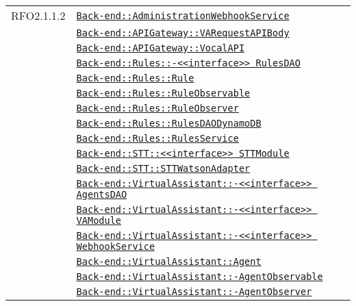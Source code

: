 \begin{longtable}{|>{\centering}m{3cm}|m{10cm}<{\centering}|}
RFO2.1.1.2 & \hyperref[Back-end::AdministrationWebhookService]{\texttt{Back-end::AdministrationWebhookService}}\\
& \hyperref[Back-end::APIGateway::VARequestAPIBody]{\texttt{Back-end::APIGateway::VARequestAPIBody}}\\
& \hyperref[Back-end::APIGateway::VocalAPI]{\texttt{Back-end::APIGateway::VocalAPI}}\\
& \hyperref[Back-end::Rules::<<interface>> RulesDAO]{\texttt{Back-end::Rules::-\linebreak <<interface>> RulesDAO}}\\
& \hyperref[Back-end::Rules::Rule]{\texttt{Back-end::Rules::Rule}}\\
& \hyperref[Back-end::Rules::RuleObservable]{\texttt{Back-end::Rules::RuleObservable}}\\
& \hyperref[Back-end::Rules::RuleObserver]{\texttt{Back-end::Rules::RuleObserver}}\\
& \hyperref[Back-end::Rules::RulesDAODynamoDB]{\texttt{Back-end::Rules::RulesDAODynamoDB}}\\
& \hyperref[Back-end::Rules::RulesService]{\texttt{Back-end::Rules::RulesService}}\\
& \hyperref[Back-end::STT::<<interface>> STTModule]{\texttt{Back-end::STT::<<interface>> STTModule}}\\
& \hyperref[Back-end::STT::STTWatsonAdapter]{\texttt{Back-end::STT::STTWatsonAdapter}}\\
& \hyperref[Back-end::VirtualAssistant::<<interface>> AgentsDAO]{\texttt{Back-end::VirtualAssistant::-\linebreak <<interface>> AgentsDAO}}\\
& \hyperref[Back-end::VirtualAssistant::<<interface>> VAModule]{\texttt{Back-end::VirtualAssistant::-\linebreak <<interface>> VAModule}}\\
& \hyperref[Back-end::VirtualAssistant::<<interface>> WebhookService]{\texttt{Back-end::VirtualAssistant::-\linebreak <<interface>> WebhookService}}\\
& \hyperref[Back-end::VirtualAssistant::Agent]{\texttt{Back-end::VirtualAssistant::Agent}}\\
& \hyperref[Back-end::VirtualAssistant::AgentObservable]{\texttt{Back-end::VirtualAssistant::-\linebreak AgentObservable}}\\
& \hyperref[Back-end::VirtualAssistant::AgentObserver]{\texttt{Back-end::VirtualAssistant::-\linebreak AgentObserver}}\\

\end{longtable}
